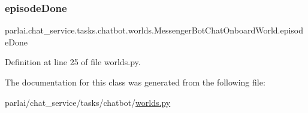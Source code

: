 \subsubsection{\texorpdfstring{episode\+Done}{episodeDone}}
{\footnotesize\ttfamily parlai.\+chat\+\_\+service.\+tasks.\+chatbot.\+worlds.\+Messenger\+Bot\+Chat\+Onboard\+World.\+episode\+Done}



Definition at line 25 of file worlds.\+py.



The documentation for this class was generated from the following file\+:\begin{DoxyCompactItemize}
\item 
parlai/chat\+\_\+service/tasks/chatbot/\hyperlink{parlai_2chat__service_2tasks_2chatbot_2worlds_8py}{worlds.\+py}\end{DoxyCompactItemize}
